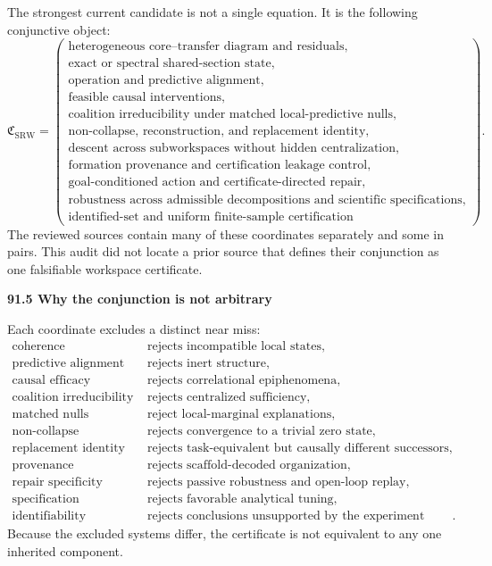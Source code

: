 \documentclass[11pt,letterpaper]{article}
\newcommand{\subtopic}[1]{%
 \vspace{0.45em}
 {\bfseries\color{AccentColor} #1\par}
}
\theoremstyle{plain}
\theoremstyle{definition}
\begin{document}
The strongest current candidate is not a single equation. It is the following
conjunctive object:
\[
\boxed{
\mathfrak C_{\mathrm{SRW}}
=
\left(
\begin{array}{c}
\text{heterogeneous core--transfer diagram and residuals},\\
\text{exact or spectral shared-section state},\\
\text{operation and predictive alignment},\\
\text{feasible causal interventions},\\
\text{coalition irreducibility under matched local-predictive nulls},\\
\text{non-collapse, reconstruction, and replacement identity},\\
\text{descent across subworkspaces without hidden centralization},\\
\text{formation provenance and certification leakage control},\\
\text{goal-conditioned action and certificate-directed repair},\\
\text{robustness across admissible decompositions and scientific specifications},\\
\text{identified-set and uniform finite-sample certification}
\end{array}
\right).
}
\]
The reviewed sources contain many of these coordinates separately and some in
pairs. This audit did not locate a prior source that defines their conjunction
as one falsifiable workspace certificate.

\subtopic{91.5 Why the conjunction is not arbitrary}

Each coordinate excludes a distinct near miss:
\[
\begin{array}{ll}
\text{coherence} & \text{rejects incompatible local states},\\
\text{predictive alignment} & \text{rejects inert structure},\\
\text{causal efficacy} & \text{rejects correlational epiphenomena},\\
\text{coalition irreducibility} & \text{rejects centralized sufficiency},\\
\text{matched nulls} & \text{reject local-marginal explanations},\\
\text{non-collapse} & \text{rejects convergence to a trivial zero state},\\
\text{replacement identity} & \text{rejects task-equivalent but causally different successors},\\
\text{provenance} & \text{rejects scaffold-decoded organization},\\
\text{repair specificity} & \text{rejects passive robustness and open-loop replay},\\
\text{specification robustness} & \text{rejects favorable analytical tuning},\\
\text{identifiability} & \text{rejects conclusions unsupported by the experiment family}.
\end{array}
\]
Because the excluded systems differ, the certificate is not equivalent to any
one inherited component.
\end{document}
